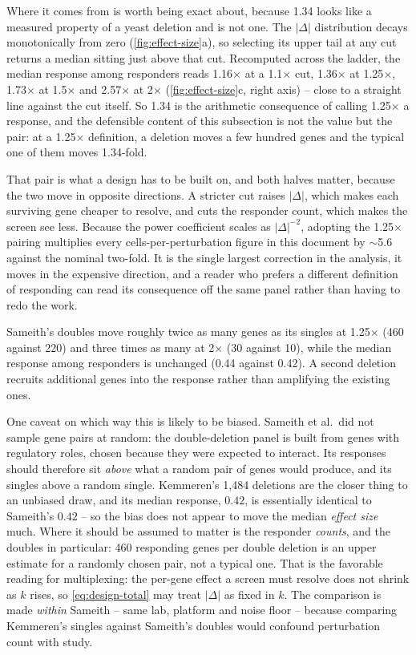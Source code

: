 Where it comes from is worth being exact about, because 1.34 looks like a
measured property of a yeast deletion and is not one. The $|\Delta|$ distribution
decays monotonically from zero (\cref{fig:effect-size}a), so selecting its upper
tail at any cut returns a median sitting just above that cut. Recomputed across
the ladder, the median response among responders reads 1.16$\times$ at a 1.1$\times$ cut,
1.36$\times$ at 1.25$\times$, 1.73$\times$ at 1.5$\times$ and 2.57$\times$ at
2$\times$ (\cref{fig:effect-size}c, right axis) -- close to a straight line
against the cut itself. So 1.34 is the arithmetic consequence of calling
1.25$\times$ a response, and the defensible content of this subsection is not
the value but the pair: at a 1.25$\times$ definition, a deletion moves a few
hundred genes and the typical one of them moves 1.34-fold.

That pair is what a design has to be built on, and both halves matter, because
the two move in opposite directions. A stricter cut raises $|\Delta|$, which
makes each surviving gene cheaper to resolve, and cuts the responder count, which
makes the screen see less. Because the power coefficient scales as
$|\Delta|^{-2}$, adopting the 1.25$\times$ pairing multiplies every
cells-per-perturbation figure in this document by $\sim$5.6 against the nominal
two-fold. It is the single largest correction in the analysis, it moves in the
expensive direction, and a reader who prefers a different definition of
responding can read its consequence off the same panel rather than having to
redo the work.

 Sameith's
doubles move roughly twice as many genes as its singles at 1.25$\times$ (460
against 220) and three times as many at 2$\times$ (30 against 10), while the
median response among responders is unchanged (0.44 against 0.42). A second
deletion recruits additional genes into the response rather than amplifying the
existing ones.

One caveat on which way this is likely to be biased. Sameith et al.\ did not
sample gene pairs at random: the double-deletion panel is built from genes with
regulatory roles, chosen because they were expected to interact. Its responses
should therefore sit \emph{above} what a random pair of genes would produce, and
its singles above a random single. Kemmeren's 1{,}484 deletions are the closer
thing to an unbiased draw, and its median response, $0.42$, is essentially
identical to Sameith's $0.42$ -- so the bias does not appear to move the median
\emph{effect size} much. Where it should be assumed to matter is the responder
\emph{counts}, and the doubles in particular: 460 responding genes per double
deletion is an upper estimate for a randomly chosen pair, not a typical one. That is the favorable reading for multiplexing: the per-gene
effect a screen must resolve does not shrink as $k$ rises, so
\cref{eq:design-total} may treat $|\Delta|$ as fixed in $k$. The comparison is
made \emph{within} Sameith -- same lab, platform and noise floor -- because
comparing Kemmeren's singles against Sameith's doubles would confound perturbation
count with study.

